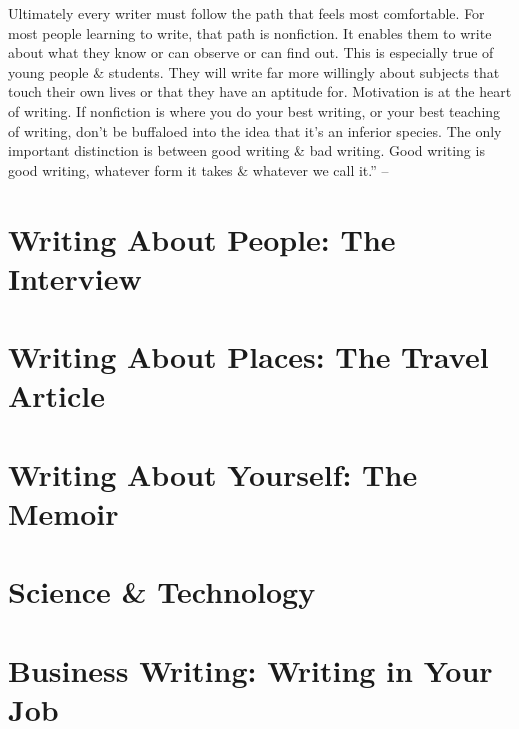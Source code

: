 \documentclass{article}
\begin{document}
Ultimately every writer must follow the path that feels most comfortable. For most people learning to write, that path is nonfiction. It enables them to write about what they know or can observe or can find out. This is especially true of young people \& students. They will write far more willingly about subjects that touch their own lives or that they have an aptitude for. Motivation is at the heart of writing. If nonfiction is where you do your best writing, or your best teaching of writing, don't be buffaloed into the idea that it's an inferior species. The only important distinction is between good writing \& bad writing. Good writing is good writing, whatever form it takes \& whatever we call it.'' -- \cite[pp. 93--96]{Zinsser2016}


\section{Writing About People: The Interview}


\section{Writing About Places: The Travel Article}


\section{Writing About Yourself: The Memoir}


\section{Science \& Technology}


\section{Business Writing: Writing in Your Job}
\end{document}
